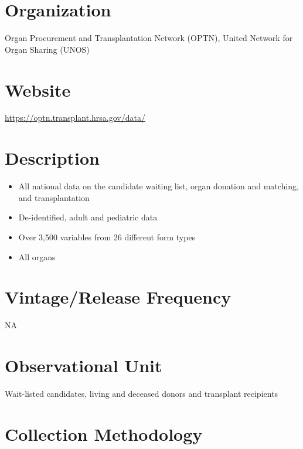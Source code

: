 \documentclass[
]{book}
\providecommand{\tightlist}{%
  \setlength{\itemsep}{0pt}\setlength{\parskip}{0pt}}
\begin{document}
\hypertarget{organization-91}{%
\section{Organization}\label{organization-91}}

Organ Procurement and Transplantation Network (OPTN), United Network for Organ Sharing (UNOS)

\hypertarget{website-91}{%
\section{Website}\label{website-91}}

\url{https://optn.transplant.hrsa.gov/data/}

\hypertarget{description-91}{%
\section{Description}\label{description-91}}

\begin{itemize}
\tightlist
\item
  All national data on the candidate waiting list, organ donation and matching, and transplantation
\item
  De-identified, adult and pediatric data
\item
  Over 3,500 variables from 26 different form types
\item
  All organs
\end{itemize}

\hypertarget{vintagerelease-frequency-91}{%
\section{Vintage/Release Frequency}\label{vintagerelease-frequency-91}}

NA

\hypertarget{observational-unit-91}{%
\section{Observational Unit}\label{observational-unit-91}}

Wait-listed candidates, living and deceased donors and transplant recipients

\hypertarget{collection-methodology-91}{%
\section{Collection Methodology}\label{collection-methodology-91}}
\end{document}
